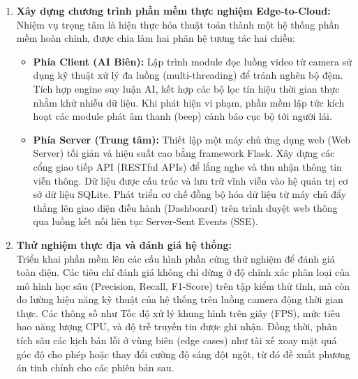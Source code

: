 \documentclass[../DoAn.tex]{subfiles}
\begin{document}
\begin{enumerate}
    \item \textbf{Xây dựng chương trình phần mềm thực nghiệm Edge-to-Cloud:}\\
    Nhiệm vụ trọng tâm là hiện thực hóa thuật toán thành một hệ thống phần mềm hoàn chỉnh, được chia làm hai phân hệ tương tác hai chiều:
    \begin{itemize}
        \item \textbf{Phía Client (AI Biên):} Lập trình module đọc luồng video từ camera sử dụng kỹ thuật xử lý đa luồng (multi-threading) để tránh nghẽn bộ đệm. Tích hợp engine suy luận AI, kết hợp các bộ lọc tín hiệu thời gian thực nhằm khử nhiễu dữ liệu. Khi phát hiện vi phạm, phần mềm lập tức kích hoạt các module phát âm thanh (beep) cảnh báo cục bộ tới người lái.
        \item \textbf{Phía Server (Trung tâm):} Thiết lập một máy chủ ứng dụng web (Web Server) tối giản và hiệu suất cao bằng framework Flask. Xây dựng các cổng giao tiếp API (RESTful APIs) để lắng nghe và thu nhận thông tin viễn thông. Dữ liệu được cấu trúc và lưu trữ vĩnh viễn vào hệ quản trị cơ sở dữ liệu SQLite. Phát triển cơ chế đồng bộ hóa dữ liệu từ máy chủ đẩy thẳng lên giao diện điều hành (Dashboard) trên trình duyệt web thông qua luồng kết nối liên tục Server-Sent Events (SSE).
    \end{itemize}
    
    \item \textbf{Thử nghiệm thực địa và đánh giá hệ thống:}\\
    Triển khai phần mềm lên các cấu hình phần cứng thử nghiệm để đánh giá toàn diện. Các tiêu chí đánh giá không chỉ dừng ở độ chính xác phân loại của mô hình học sâu (Precision, Recall, F1-Score) trên tập kiểm thử tĩnh, mà còn đo lường hiệu năng kỹ thuật của hệ thống trên luồng camera động thời gian thực. Các thông số như Tốc độ xử lý khung hình trên giây (FPS), mức tiêu hao năng lượng CPU, và độ trễ truyền tin được ghi nhận. Đồng thời, phân tích sâu các kịch bản lỗi ở vùng biên (edge cases) như tài xế xoay mặt quá góc độ cho phép hoặc thay đổi cường độ sáng đột ngột, từ đó đề xuất phương án tinh chỉnh cho các phiên bản sau.
\end{enumerate}
\end{document}
